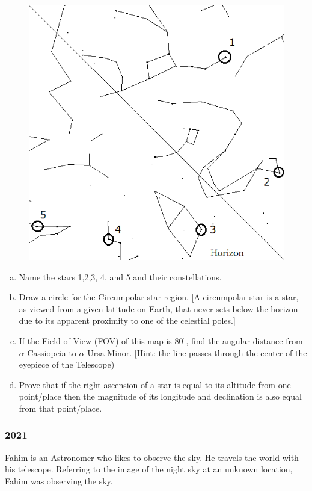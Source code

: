 \documentclass[a4paper,12pt]{extarticle}
\begin{document}
\begin{figure}[H]
    \centering
    \includegraphics[width=0.8\linewidth]{BDOAA_19.png}
\end{figure}
\begin{enumerate}[a.]
    \item Name the stars 1,2,3, 4, and 5 and their constellations.
    \item Draw a circle for the Circumpolar star region. [A circumpolar star is a star, as viewed from a given latitude on Earth, that never sets below the horizon due to its apparent proximity to one of the celestial poles.]
    \item If the Field of View (FOV) of this map is $80^\circ$, find the angular distance from $\alpha$ Cassiopeia to $\alpha$ Ursa Minor. [Hint: the line passes through the center of the eyepiece of the Telescope)
    \item Prove that if the right ascension of a star is equal to its altitude from one point/place then the magnitude of its longitude and declination is also equal from that point/place.
\end{enumerate}
\subsubsection{2021}
Fahim is an Astronomer who likes to observe the sky. He travels the world with his telescope. Referring to the image of the night sky at an unknown location, Fahim was observing the sky. 
\end{document}
